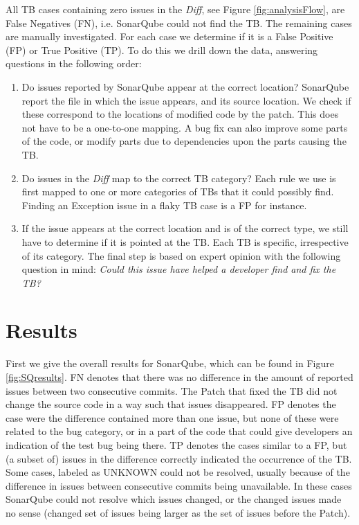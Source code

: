 \documentclass{uvamscse}
\begin{document}
All TB cases containing zero issues in the \emph{Diff}, see Figure \ref{fig:analysisFlow}, are  False Negatives (FN), i.e. SonarQube could not find the TB. The remaining cases are manually investigated. For each case we determine if it is a False Positive (FP) or True Positive (TP). To do this we drill down the data, answering questions in the following order: 

\begin{enumerate}
	
	\item Do issues reported by SonarQube appear at the correct location? SonarQube report the file in which the issue appears, and its source location. We check if these correspond to the locations of modified code by the patch. This does not have to be a one-to-one mapping. A bug fix can also improve some parts of the code, or modify parts due to dependencies upon the parts causing the TB.
	\item Do issues in the \emph{Diff} map to the correct TB category? Each rule we use is first mapped to one or more categories of TBs that it could possibly find. Finding an Exception issue in a flaky TB case is a FP for instance.
	\item If the issue appears at the correct location and is of the correct type, we still have to determine if it is pointed at the TB. Each TB is specific, irrespective of its category. The final step is based on expert opinion with the following question in mind: \emph{Could this issue have helped a developer find and fix the TB?}
\end{enumerate}


\section{Results}
\label{sec:TBresults}

First we give the overall results for SonarQube, which can be found in Figure \ref{fig:SQresults}. FN denotes that there was no difference in the amount of reported issues between two consecutive commits. The Patch that fixed the TB did not change the source code in a way such that issues disappeared. FP denotes the case were the difference contained more than one issue, but none of these were related to the bug category, or in a part of the code that could give developers an indication of the test bug being there. TP denotes the cases similar to a FP, but (a subset of) issues in the difference correctly indicated the occurrence of the TB. Some cases, labeled as UNKNOWN could not be resolved, usually because of the difference in issues between consecutive commits being unavailable. In these cases SonarQube could not resolve which issues changed, or the changed issues made no sense (changed set of issues being larger as the set of issues before the Patch).
\end{document}

